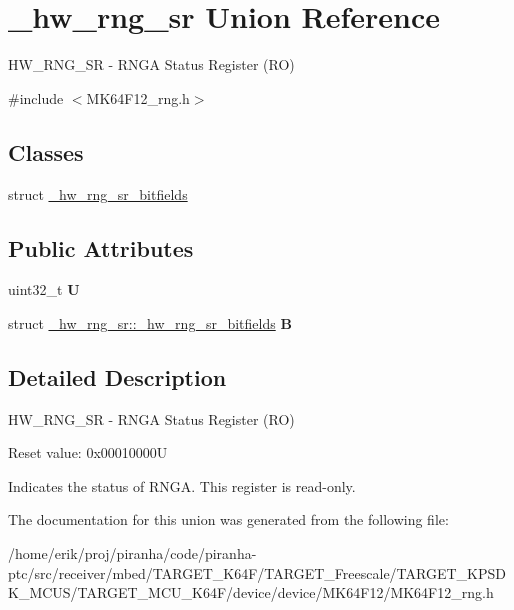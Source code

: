 \hypertarget{union__hw__rng__sr}{}\section{\+\_\+hw\+\_\+rng\+\_\+sr Union Reference}
\label{union__hw__rng__sr}


H\+W\+\_\+\+R\+N\+G\+\_\+\+SR -\/ R\+N\+GA Status Register (RO)  




{\ttfamily \#include $<$M\+K64\+F12\+\_\+rng.\+h$>$}

\subsection*{Classes}
\begin{DoxyCompactItemize}
\item 
struct \hyperlink{struct__hw__rng__sr_1_1__hw__rng__sr__bitfields}{\+\_\+hw\+\_\+rng\+\_\+sr\+\_\+bitfields}
\end{DoxyCompactItemize}
\subsection*{Public Attributes}
\begin{DoxyCompactItemize}
\item 
uint32\+\_\+t {\bfseries U}\hypertarget{union__hw__rng__sr_a2d227579d36fa8652aadb55f31e9e3db}{}\label{union__hw__rng__sr_a2d227579d36fa8652aadb55f31e9e3db}

\item 
struct \hyperlink{struct__hw__rng__sr_1_1__hw__rng__sr__bitfields}{\+\_\+hw\+\_\+rng\+\_\+sr\+::\+\_\+hw\+\_\+rng\+\_\+sr\+\_\+bitfields} {\bfseries B}\hypertarget{union__hw__rng__sr_ae5c04237386d4f6f8d76dba9c8434ef4}{}\label{union__hw__rng__sr_ae5c04237386d4f6f8d76dba9c8434ef4}

\end{DoxyCompactItemize}


\subsection{Detailed Description}
H\+W\+\_\+\+R\+N\+G\+\_\+\+SR -\/ R\+N\+GA Status Register (RO) 

Reset value\+: 0x00010000U

Indicates the status of R\+N\+GA. This register is read-\/only. 

The documentation for this union was generated from the following file\+:\begin{DoxyCompactItemize}
\item 
/home/erik/proj/piranha/code/piranha-\/ptc/src/receiver/mbed/\+T\+A\+R\+G\+E\+T\+\_\+\+K64\+F/\+T\+A\+R\+G\+E\+T\+\_\+\+Freescale/\+T\+A\+R\+G\+E\+T\+\_\+\+K\+P\+S\+D\+K\+\_\+\+M\+C\+U\+S/\+T\+A\+R\+G\+E\+T\+\_\+\+M\+C\+U\+\_\+\+K64\+F/device/device/\+M\+K64\+F12/M\+K64\+F12\+\_\+rng.\+h\end{DoxyCompactItemize}
